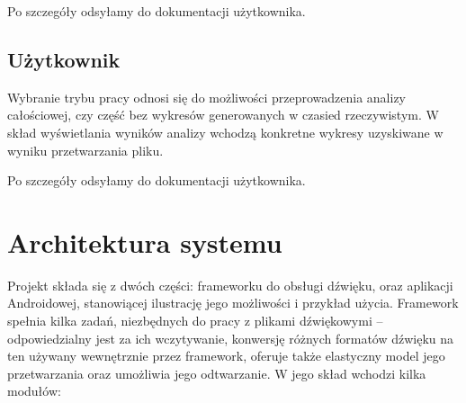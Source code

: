 Po szczegóły odsyłamy do dokumentacji użytkownika.
\section{Użytkownik}
Wybranie trybu pracy odnosi się do możliwości przeprowadzenia analizy całościowej, czy część bez wykresów generowanych w czasied rzeczywistym.
W skład wyświetlania wyników analizy wchodzą konkretne wykresy uzyskiwane w wyniku przetwarzania pliku.

Po szczegóły odsyłamy do dokumentacji użytkownika.

\chapter{Architektura systemu}

Projekt składa się z dwóch części: frameworku do obsługi dźwięku, oraz aplikacji Androidowej,
stanowiącej ilustrację jego możliwości i przykład użycia. Framework spełnia kilka zadań, niezbędnych
do pracy z plikami dźwiękowymi -- odpowiedzialny jest za ich wczytywanie, konwersję różnych formatów
dźwięku na ten używany wewnętrznie przez framework, oferuje także elastyczny model jego
przetwarzania oraz umożliwia jego odtwarzanie. W jego skład wchodzi kilka modułów:

